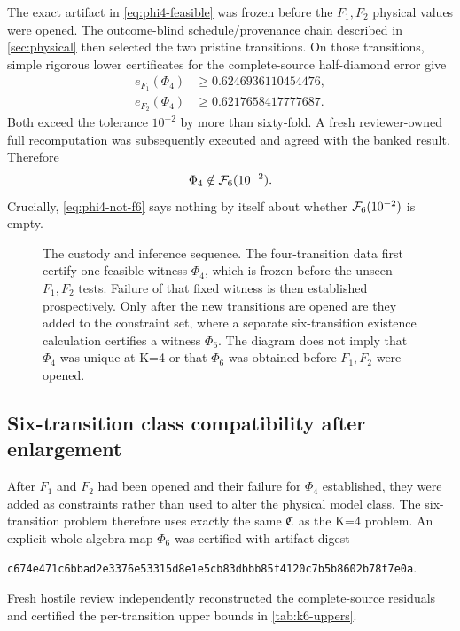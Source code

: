 The exact artifact in \cref{eq:phi4-feasible} was frozen before the $F_1,F_2$ physical values were opened.  The outcome-blind schedule/provenance chain described in \cref{sec:physical} then selected the two pristine transitions.  On those transitions, simple rigorous lower certificates for the complete-source half-diamond error give
\begin{align}
e_{F_1}(\Phi_4)&\ge0.6246936110454476,\\
e_{F_2}(\Phi_4)&\ge0.6217658417777687.
\label{eq:phi4-forward-failure}
\end{align}
Both exceed the tolerance $10^{-2}$ by more than sixty-fold.  A fresh reviewer-owned full recomputation was subsequently executed and agreed with the banked result.  Therefore
\begin{equation}
\Phi_4\notin\mathcal F_6(10^{-2}).
\label{eq:phi4-not-f6}
\end{equation}
Crucially, \cref{eq:phi4-not-f6} says nothing by itself about whether $\mathcal F_6(10^{-2})$ is empty.

\begin{figure}[ht]
\centering

\caption{The custody and inference sequence.  The four-transition data first certify one feasible witness $\Phi_4$, which is frozen before the unseen $F_1,F_2$ tests.  Failure of that fixed witness is then established prospectively.  Only after the new transitions are opened are they added to the constraint set, where a separate six-transition existence calculation certifies a witness $\Phi_6$.  The diagram does not imply that $\Phi_4$ was unique at K=4 or that $\Phi_6$ was obtained before $F_1,F_2$ were opened.}
\label{fig:fit-prediction}
\end{figure}

\subsection{Six-transition class compatibility after enlargement}

After $F_1$ and $F_2$ had been opened and their failure for $\Phi_4$ established, they were added as constraints rather than used to alter the physical model class.  The six-transition problem therefore uses exactly the same $\mathfrak C$ as the K=4 problem.  An explicit whole-algebra map $\Phi_6$ was certified with artifact digest
\begin{center}
\texttt{c674e471c6bbad2e3376e53315d8e1e5cb83dbbb85f4120c7b5b8602b78f7e0a}.
\end{center}
Fresh hostile review independently reconstructed the complete-source residuals and certified the per-transition upper bounds in \cref{tab:k6-uppers}.

